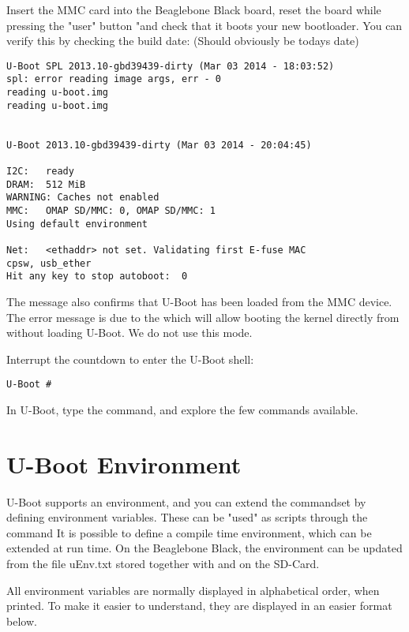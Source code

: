 Insert the MMC card into the Beaglebone Black board, reset the board while pressing
the "user" button "and check that it boots your new bootloader. You can verify this by checking
the build date: (Should obviously be todays date)

\begin{verbatim}
U-Boot SPL 2013.10-gbd39439-dirty (Mar 03 2014 - 18:03:52)
spl: error reading image args, err - 0
reading u-boot.img
reading u-boot.img


U-Boot 2013.10-gbd39439-dirty (Mar 03 2014 - 20:04:45)

I2C:   ready
DRAM:  512 MiB
WARNING: Caches not enabled
MMC:   OMAP SD/MMC: 0, OMAP SD/MMC: 1
Using default environment

Net:   <ethaddr> not set. Validating first E-fuse MAC
cpsw, usb_ether
Hit any key to stop autoboot:  0 
\end{verbatim}

The message  also confirms that U-Boot has
been loaded from the MMC device. The error message is due to the  which
will allow booting the kernel directly from  without loading U-Boot. We do not use this mode.

Interrupt the countdown to enter the U-Boot shell:
\begin{verbatim}
U-Boot #
\end{verbatim}

In U-Boot, type the  command, and explore the few commands available.
\clearpage
\section{U-Boot Environment}
U-Boot supports an environment, and you can extend the commandset by defining environment variables.
These can be "used" as scripts through the  command
It is possible to define a compile time environment, which can be extended at run time.
On the Beaglebone Black, the environment can be updated from the file uEnv.txt stored
together with  and  on the SD-Card.

All environment variables are normally displayed in alphabetical order, when printed.
To make it easier to understand, they are displayed in an easier format below.

